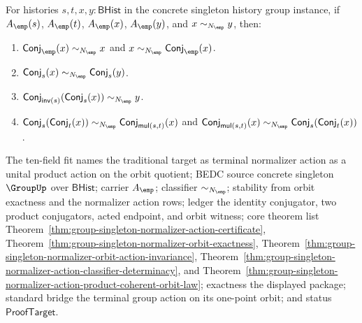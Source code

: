 \begin{theorem}
\label{thm:group-singleton-normalizer-orbit-action-unital-product-package}
For histories $s,t,x,y:\mathsf{BHist}$ in the concrete singleton history group
instance, if $A_{\emp}(s)$, $A_{\emp}(t)$, $A_{\emp}(x)$, $A_{\emp}(y)$, and
$x\sim_{N_{\emp}}y$, then:
\begin{enumerate}
\item
$\mathsf{Conj}_{\emp}(x)\sim_{N_{\emp}}x$ and
$x\sim_{N_{\emp}}\mathsf{Conj}_{\emp}(x)$.
\item $\mathsf{Conj}_s(x)\sim_{N_{\emp}}\mathsf{Conj}_s(y)$.
\item
$\mathsf{Conj}_{\mathsf{inv}(s)}(\mathsf{Conj}_s(x))\sim_{N_{\emp}}y$.
\item
$\mathsf{Conj}_s(\mathsf{Conj}_t(x))\sim_{N_{\emp}}
\mathsf{Conj}_{\mathsf{mul}(s,t)}(x)$ and
$\mathsf{Conj}_{\mathsf{mul}(s,t)}(x)\sim_{N_{\emp}}
\mathsf{Conj}_s(\mathsf{Conj}_t(x))$.
\end{enumerate}
The ten-field fit names the traditional target as terminal normalizer action as
a unital product action on the orbit quotient; BEDC source concrete singleton
$\GroupUp$ over $\mathsf{BHist}$; carrier $A_{\emp}$; classifier
$\sim_{N_{\emp}}$; stability from orbit exactness and the normalizer action
rows; ledger the identity conjugator, two product conjugators, acted endpoint,
and orbit witness; core theorem list
Theorem~\ref{thm:group-singleton-normalizer-action-certificate},
Theorem~\ref{thm:group-singleton-normalizer-orbit-exactness},
Theorem~\ref{thm:group-singleton-normalizer-orbit-action-invariance},
Theorem~\ref{thm:group-singleton-normalizer-action-classifier-determinacy}, and
Theorem~\ref{thm:group-singleton-normalizer-action-product-coherent-orbit-law};
exactness the displayed package; standard bridge the terminal group action on
its one-point orbit; and status $\mathsf{ProofTarget}$.
\end{theorem}
